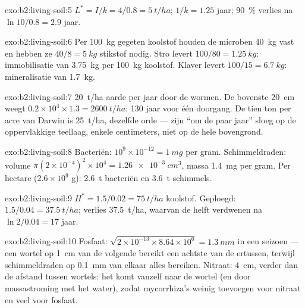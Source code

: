 \begin{solution}{exo:b2:living-soil:5}
$L^{*} = I/k = 4/0.8 = \qty{5}{t/ha}$;  $1/k = 1.25$
jaar; \qty{90}{\%} verlies na $\ln 10/0.8 = 2.9$ jaar.
\end{solution}

\begin{solution}{exo:b2:living-soil:6}
Per \qty{100}{kg} gegeten koolstof houden de microben \qty{40}{kg} vast en
hebben ze $40/8 = \qty{5}{kg}$ stikstof nodig. Stro levert $100/80 =
\qty{1.25}{kg}$: immobilisatie van \qty{3.75}{kg} per \qty{100}{kg}
koolstof. Klaver levert $100/15 = \qty{6.7}{kg}$: mineralisatie
van \qty{1.7}{kg}.
\end{solution}

\begin{solution}{exo:b2:living-soil:7}
\qty{20}{t/ha} aarde per jaar door de wormen. De bovenste
\qty{20}{cm} weegt $0.2\times 10^{4}\times 1.3 = \qty{2600}{t/ha}$:
130 jaar voor één doorgang. De tien ton per acre van Darwin is
\qty{25}{t/ha}, dezelfde orde --- zijn ``om de paar jaar'' sloeg op de
oppervlakkige teellaag, enkele centimeters, niet op de hele bovengrond.
\end{solution}

\begin{solution}{exo:b2:living-soil:8}
Bacteriën: $10^{9}\times 10^{-12} = \qty{1}{mg}$ per gram. Schimmeldraden:
volume $\pi(2\times 10^{-4})^{2}\times 10^{4} = \qty{1.26e-3}{cm^3}$,
massa \qty{1.4}{mg} per gram. Per hectare ($2.6\times 10^{9}$ g):
\qty{2.6}{t} bacteriën en \qty{3.6}{t} schimmels.
\end{solution}

\begin{solution}{exo:b2:living-soil:9}
$H^{*} = 1.5/0.02 = \qty{75}{t/ha}$ koolstof. Geploegd: $1.5/0.04
= \qty{37.5}{t/ha}$; verlies \qty{37.5}{t/ha}, waarvan de helft verdwenen na
$\ln 2/0.04 = 17$ jaar.
\end{solution}

\begin{solution}{exo:b2:living-soil:10}
Fosfaat: $\sqrt{2\times 10^{-13}\times 8.64\times 10^{6}} =
\qty{1.3}{mm}$ in een seizoen --- een wortel op \qty{1}{cm} van de volgende
bereikt een achtste van de  ertussen, terwijl schimmeldraden op
\qty{0.1}{mm} van elkaar alles bereiken. Nitraat: \qty{4}{cm}, verder
dan de afstand tussen wortels: het komt vanzelf naar de wortel (en door
massastroming met het water), zodat mycorrhiza's weinig toevoegen voor nitraat
en veel voor fosfaat.
\end{solution}

